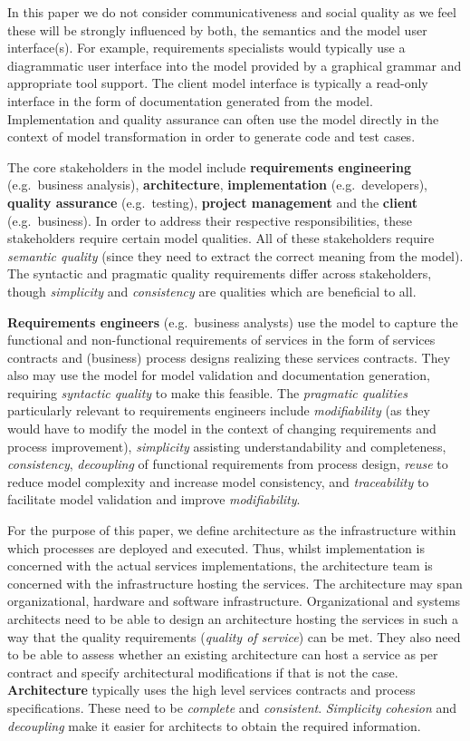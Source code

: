 In this paper we do not consider communicativeness and social quality as we feel these will be strongly influenced by both, the semantics and the model user interface(s). For example, requirements specialists would typically use a diagrammatic user interface into the model provided by a graphical grammar and appropriate tool support. The client model interface is typically a read-only interface in the form of documentation generated from the model. Implementation and quality assurance can often use the model directly in the context of model transformation in order to generate code and test cases.

The core stakeholders in the model include {\bf requirements engineering} (e.g.\ business analysis), {\bf architecture}, {\bf implementation} (e.g.\ developers), {\bf quality assurance} (e.g.\ testing), {\bf project management} and the {\bf client} (e.g.\ business). In order to address their respective responsibilities, these stakeholders require certain model qualities. All of these stakeholders require \emph{semantic quality} (since they need to extract the correct meaning from the model). The syntactic and pragmatic quality requirements differ across stakeholders, though \emph{simplicity} and \emph{consistency} are qualities which are beneficial to all.

{\bf Requirements engineers} (e.g.\ business analysts) use the model to capture the functional and non-functional requirements of services in the form of services contracts and (business) process designs realizing these services contracts. They also may use the model for model validation and documentation generation, requiring \emph{syntactic quality} to make this feasible.  The \emph{pragmatic qualities} particularly relevant to requirements engineers include \emph{modifiability} (as they would have to modify the model in the context of changing requirements and process improvement), \emph{simplicity} assisting understandability and completeness, \emph{consistency}, \emph{decoupling} of functional requirements from process design, \emph{reuse} to reduce model complexity and increase model consistency, and \emph{traceability} to facilitate model validation and improve \emph{modifiability}. 

For the purpose of this paper, we define architecture as the infrastructure within which processes are deployed and executed. Thus, whilst implementation is concerned with the actual services implementations, the architecture team is concerned with the infrastructure hosting the services. The architecture may span organizational, hardware and software infrastructure. Organizational and systems architects need to be able to design an architecture hosting the services in such a way that the quality requirements (\emph{quality of service}) can be met. They also need to be able to assess whether an existing architecture can host a service as per contract and specify architectural modifications if that is not the case. {\bf Architecture} typically uses the high level services contracts and process specifications. These need to be \emph{complete} and \emph{consistent}. \emph{Simplicity} \emph{cohesion} and \emph{decoupling} make it easier for architects to obtain the required information.

